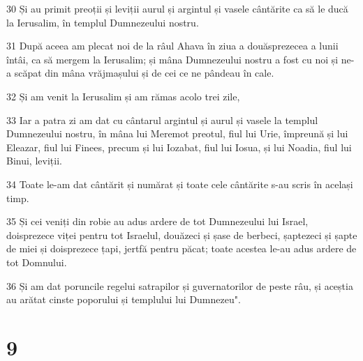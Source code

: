 \par 30 Și au primit preoții și leviții aurul și argintul și vasele cântărite ca să le ducă la Ierusalim, în templul Dumnezeului nostru.
\par 31 După aceea am plecat noi de la râul Ahava în ziua a douăsprezecea a lunii întâi, ca să mergem la Ierusalim; și mâna Dumnezeului nostru a fost cu noi și ne-a scăpat din mâna vrăjmașului și de cei ce ne pândeau în cale.
\par 32 Și am venit la Ierusalim și am rămas acolo trei zile,
\par 33 Iar a patra zi am dat cu cântarul argintul și aurul și vasele la templul Dumnezeului nostru, în mâna lui Meremot preotul, fiul lui Urie, împreună și lui Eleazar, fiul lui Finees, precum și lui Iozabat, fiul lui Iosua, și lui Noadia, fiul lui Binui, leviții.
\par 34 Toate le-am dat cântărit și numărat și toate cele cântărite s-au scris în același timp.
\par 35 Și cei veniți din robie au adus ardere de tot Dumnezeului lui Israel, doisprezece viței pentru tot Israelul, douăzeci și șase de berbeci, șaptezeci și șapte de miei și doisprezece țapi, jertfă pentru păcat; toate acestea le-au adus ardere de tot Domnului.
\par 36 Și am dat poruncile regelui satrapilor și guvernatorilor de peste râu, și aceștia au arătat cinste poporului și templului lui Dumnezeu".

\chapter{9}

